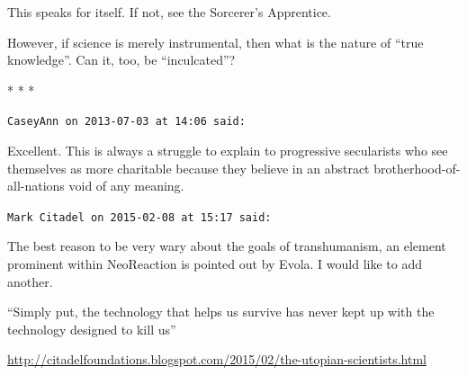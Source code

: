 \begin{quotex}
This speaks for itself. If not, see the Sorcerer's Apprentice.

However, if science is merely instrumental, then what is the nature of ``true knowledge''. Can it, too, be ``inculcated''?
\end{quotex}


\begin{center}* * *\end{center}

\begin{footnotesize}
\begin{sffamily}
\texttt{CaseyAnn on 2013-07-03 at 14:06 said:}

Excellent. This is always a struggle to explain to progressive secularists who see themselves as more charitable because they believe in an abstract brotherhood-of-all-nations void of any meaning.

\hfill

\texttt{Mark Citadel on 2015-02-08 at 15:17 said:}

The best reason to be very wary about the goals of transhumanism, an element prominent within NeoReaction is pointed out by Evola. I would like to add another.

``Simply put, the technology that helps us survive has never kept up with the technology designed to kill us''

\url{http://citadelfoundations.blogspot.com/2015/02/the-utopian-scientists.html}



\hfill

\end{sffamily}
\end{footnotesize}

